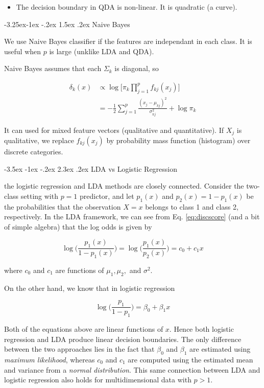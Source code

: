 \documentclass[]{book}
\makeatletter
\newenvironment{rmdblock}[1]
  {\begin{shaded*}
  \begin{itemize}
  \renewcommand{\labelitemi}{
    \raisebox{-.7\height}[0pt][0pt]{
      {\setkeys{Gin}{width=2em,keepaspectratio}\texttt{[image: img/icons/\#1]}}
    }
  }
  \item
  }
  {
  \end{itemize}
  \end{shaded*}
  }
\newenvironment{rmdcaution}
  {\begin{rmdblock}{caution}}
  {\end{rmdblock}}
\renewcommand\section{\@startsection {section}{1}{\z@}%
                                   {-3.5ex \@plus -1ex \@minus -.2ex}%
                                   {2.3ex \@plus.2ex}%
                                   {\normalfont\Large\bfseries\color{ForestGreen}}}
\renewcommand\subsection{\@startsection{subsection}{2}{\z@}%
                                     {-3.25ex\@plus -1ex \@minus -.2ex}%
                                     {1.5ex \@plus .2ex}%
                                     {\normalfont\large\bfseries\color{Violet}}}
\theoremstyle{definition}
\theoremstyle{definition}
\theoremstyle{definition}
\theoremstyle{remark}
\makeatother
\begin{document}
\begin{rmdcaution}
The decision boundary in QDA is non-linear. It is quadratic (a curve).
\end{rmdcaution}

\subsection{Naive Bayes}\label{naive-bayes}

We use Naive Bayes classifier if the features are independant in each
class. It is useful when \(p\) is large (unklike LDA and QDA).

Naive Bayes assumes that each \(\Sigma_k\) is diagonal, so

\begin{align*}
\delta_k(x) &\propto \log \bigg[\pi_k \prod_{j=1}^p f_{kj}(x_j) \bigg] \\
            &= -\frac{1}{2} \sum_{j=1}^p \frac{(x_j-\mu_{kj})^2}{\sigma_{kj}^2} + \log \pi_k
\end{align*}

It can used for mixed feature vectors (qualitative and quantitative). If
\(X_j\) is qualitative, we replace \(f_{kj}(x_j)\) by probability mass
function (histogram) over discrete categories.

\section{LDA vs Logistic Regression}\label{lda-vs-logistic-regression}

the logistic regression and LDA methods are closely connected. Consider
the two-class setting with \(p =1\) predictor, and let \(p_1(x)\) and
\(p_2(x)=1−p_1(x)\) be the probabilities that the observation \(X = x\)
belongs to class 1 and class 2, respectively. In the LDA framework, we
can see from Eq. \eqref{eq:discscore} (and a bit of simple algebra) that
the log odds is given by

\[ \log \bigg(\frac{p_1(x)}{1-p_1(x)}\bigg) = \log \bigg(\frac{p_1(x)}{p_2(x)}\bigg) = c_0 + c_1 x\]

where \(c_0\) and \(c_1\) are functions of \(\mu_1, \mu_2,\) and
\(\sigma^2\).

On the other hand, we know that in logistic regression

\[ \log \bigg(\frac{p_1}{1-p_1}\bigg) = \beta_0 + \beta_1 x\]

Both of the equations above are linear functions of \(x\). Hence both
logistic regression and LDA produce linear decision boundaries. The only
diﬀerence between the two approaches lies in the fact that \(\beta_0\)
and \(\beta_1\) are estimated using \emph{maximum likelihood}, whereas
\(c_0\) and \(c_1\) are computed using the estimated mean and variance
from a \emph{normal distribution}. This same connection between LDA and
logistic regression also holds for multidimensional data with \(p> 1\).
\end{document}

